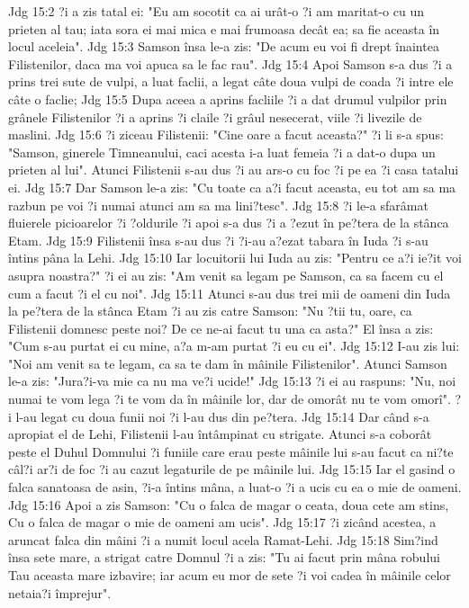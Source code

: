 Jdg 15:2  ?i a zis tatal ei: "Eu am socotit ca ai urât-o ?i am maritat-o cu un prieten al tau; iata sora ei mai mica e mai frumoasa decât ea; sa fie aceasta în locul aceleia".
Jdg 15:3  Samson însa le-a zis: "De acum eu voi fi drept înaintea Filistenilor, daca ma voi apuca sa le fac rau".
Jdg 15:4  Apoi Samson s-a dus ?i a prins trei sute de vulpi, a luat faclii, a legat câte doua vulpi de coada ?i intre ele câte o faclie;
Jdg 15:5  Dupa aceea a aprins facliile ?i a dat drumul vulpilor prin grânele Filistenilor ?i a aprins ?i claile ?i grâul nesecerat, viile ?i livezile de maslini.
Jdg 15:6  ?i ziceau Filistenii: "Cine oare a facut aceasta?" ?i li s-a spus: "Samson, ginerele Timneanului, caci acesta i-a luat femeia ?i a dat-o dupa un prieten al lui". Atunci Filistenii s-au dus ?i au ars-o cu foc ?i pe ea ?i casa tatalui ei.
Jdg 15:7  Dar Samson le-a zis: "Cu toate ca a?i facut aceasta, eu tot am sa ma razbun pe voi ?i numai atunci am sa ma lini?tesc".
Jdg 15:8  ?i le-a sfarâmat fluierele picioarelor ?i ?oldurile ?i apoi s-a dus ?i a ?ezut în pe?tera de la stânca Etam.
Jdg 15:9  Filistenii însa s-au dus ?i ?i-au a?ezat tabara în Iuda ?i s-au întins pâna la Lehi.
Jdg 15:10  Iar locuitorii lui Iuda au zis: "Pentru ce a?i ie?it voi asupra noastra?" ?i ei au zis: "Am venit sa legam pe Samson, ca sa facem cu el cum a facut ?i el cu noi".
Jdg 15:11  Atunci s-au dus trei mii de oameni din Iuda la pe?tera de la stânca Etam ?i au zis catre Samson: "Nu ?tii tu, oare, ca Filistenii domnesc peste noi? De ce ne-ai facut tu una ca asta?" El însa a zis: "Cum s-au purtat ei cu mine, a?a m-am purtat ?i eu cu ei".
Jdg 15:12  I-au zis lui: "Noi am venit sa te legam, ca sa te dam în mâinile Filistenilor". Atunci Samson le-a zis: "Jura?i-va mie ca nu ma ve?i ucide!"
Jdg 15:13  ?i ei au raspuns: "Nu, noi numai te vom lega ?i te vom da în mâinile lor, dar de omorât nu te vom omorî". ?i l-au legat cu doua funii noi ?i l-au dus din pe?tera.
Jdg 15:14  Dar când s-a apropiat el de Lehi, Filistenii l-au întâmpinat cu strigate. Atunci s-a coborât peste el Duhul Domnului ?i funiile care erau peste mâinile lui s-au facut ca ni?te câl?i ar?i de foc ?i au cazut legaturile de pe mâinile lui.
Jdg 15:15  Iar el gasind o falca sanatoasa de asin, ?i-a întins mâna, a luat-o ?i a ucis cu ea o mie de oameni.
Jdg 15:16  Apoi a zis Samson: "Cu o falca de magar o ceata, doua cete am stins, Cu o falca de magar o mie de oameni am ucis".
Jdg 15:17  ?i zicând acestea, a aruncat falca din mâini ?i a numit locul acela Ramat-Lehi.
Jdg 15:18  Sim?ind însa sete mare, a strigat catre Domnul ?i a zis: "Tu ai facut prin mâna robului Tau aceasta mare izbavire; iar acum eu mor de sete ?i voi cadea în mâinile celor netaia?i împrejur".

